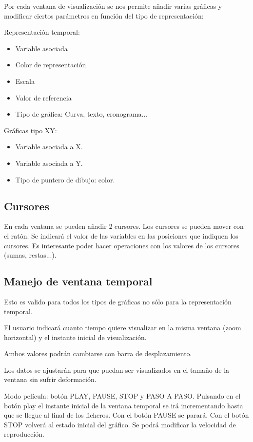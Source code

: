 Por cada ventana de visualización se nos permite añadir varias gráficas y modificar ciertos parámetros en función del tipo de representación:

Representación temporal:

\begin{itemize}
	\item Variable asociada
	\item Color de representación
	\item Escala
	\item Valor de referencia
	\item Tipo de gráfica: Curva, texto, cronograma...
\end{itemize}

Gráficas tipo XY:

\begin{itemize}
	\item Variable asociada a X.
	\item Variable asociada a Y.
	\item Tipo de puntero de dibujo: color.
\end{itemize}


\subsection{Cursores}

En cada ventana se pueden añadir 2 cursores. Los cursores se pueden mover con el ratón. Se indicará el valor de las variables en las posiciones que indiquen los cursores. Es interesante poder hacer operaciones con los valores de los cursores (sumas, restas...). 


\subsection{Manejo de ventana temporal}

Esto es valido para todos los tipos de gráficas no sólo para la representación temporal.

El usuario indicará cuanto tiempo quiere visualizar en la misma ventana (zoom horizontal) y el instante inicial de visualización.

Ambos valores podrán cambiarse con barra de desplazamiento.

Los datos se ajustarán para que puedan ser visualizados en el tamaño de la ventana sin sufrir deformación.

Modo película: botón PLAY, PAUSE, STOP y PASO A PASO. Pulsando en el botón play el instante inicial de la ventana temporal se irá incrementando hasta que se llegue al final de los ficheros. Con el botón PAUSE se parará. Con el botón STOP volverá al estado inicial del gráfico. Se podrá modificar la velocidad de reproducción.


